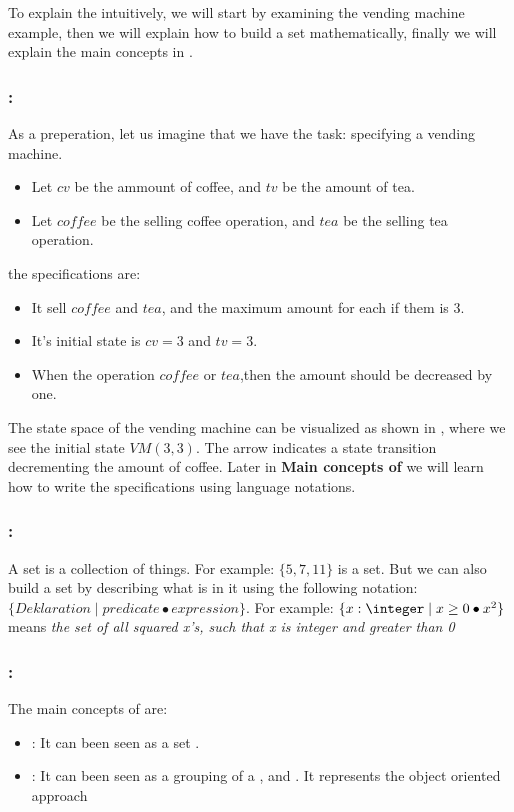 To explain the \oz{} intuitively, we will start by examining the vending machine example, then we will explain how to build a set mathematically, finally we will explain the main concepts in \oz{}. 

\subsubsection{:}
As a preperation, let us imagine that we have the task: specifying a vending machine.
\begin{itemize}
\item Let $cv$ be the ammount of coffee, and $tv$ be the amount of tea.
\item Let $coffee$ be the selling coffee operation, and $tea$ be the selling tea operation.
\end{itemize}
the specifications are:
\begin{itemize}
\item It sell $coffee$ and $tea$, and the maximum amount for each if them is 3.
\item It's initial state is  $cv = 3$ and $tv = 3$.
\item When the operation $coffee$ or $tea$,then the amount should be decreased by one.
\end{itemize} 
The state space of the vending machine can be visualized as shown in , where we see the initial state $VM(3,3)$. The arrow indicates a state transition decrementing the amount of coffee. Later in \textbf{Main concepts of \oz{}} we will learn how to write the specifications using \oz{} language notations.


\subsubsection{:} A set is a collection of things. For example: $\{5, 7, 11\}$ is a set.
But we can also build a set by describing what is in it using the following notation: $\{Deklaration \mid predicate \bullet expression \}$.  For example: $\{x: \integer \mid x \geq 0 \bullet x^{2}\}$ means \textit{the set of all  squared x's, such that x is integer and greater than 0}

	
\subsubsection{:} 
\label{main_concepts_oz} 
The main concepts of \oz{} are:
\begin{itemize}
\item {}: It can been seen as a set \cite{woodcock}.
\item {}: It can been seen as a grouping of a ,  and  \cite{kenji}. It represents the object oriented approach 
\end{itemize}

